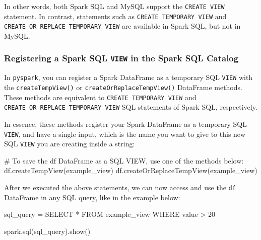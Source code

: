 \documentclass[
  11pt,
  letterpaper,
  DIV=11,
  numbers=noendperiod]{scrreprt}
\newenvironment{Shaded}{\begin{snugshade}}{\end{snugshade}}
\newcommand{\CommentTok}[1]{\textcolor[rgb]{0.37,0.37,0.37}{#1}}
\newcommand{\NormalTok}[1]{\textcolor[rgb]{0.00,0.23,0.31}{#1}}
\newcommand{\OperatorTok}[1]{\textcolor[rgb]{0.37,0.37,0.37}{#1}}
\newcommand{\StringTok}[1]{\textcolor[rgb]{0.13,0.47,0.30}{#1}}
\begin{document}
In other words, both Spark SQL and MySQL support the
\texttt{CREATE\ VIEW} statement. In contrast, statements such as
\texttt{CREATE\ TEMPORARY\ VIEW} and
\texttt{CREATE\ OR\ REPLACE\ TEMPORARY\ VIEW} are available in Spark
SQL, but not in MySQL.

\hypertarget{registering-a-spark-sql-view-in-the-spark-sql-catalog}{%
\subsubsection{\texorpdfstring{Registering a Spark SQL \texttt{VIEW} in
the Spark SQL
Catalog}{Registering a Spark SQL VIEW in the Spark SQL Catalog}}\label{registering-a-spark-sql-view-in-the-spark-sql-catalog}}

In \texttt{pyspark}, you can register a Spark DataFrame as a temporary
SQL \texttt{VIEW} with the \texttt{createTempView()} or
\texttt{createOrReplaceTempView()} DataFrame methods. These methods are
equivalent to \texttt{CREATE\ TEMPORARY\ VIEW} and
\texttt{CREATE\ OR\ REPLACE\ TEMPORARY\ VIEW} SQL statements of Spark
SQL, respectively.

In essence, these methods register your Spark DataFrame as a temporary
SQL \texttt{VIEW}, and have a single input, which is the name you want
to give to this new SQL \texttt{VIEW} you are creating inside a string:

\begin{Shaded}
\begin{Highlighting}[]
\CommentTok{\# To save the \textasciigrave{}df\textasciigrave{} DataFrame as a SQL VIEW, use one of the methods below:}
\NormalTok{df.createTempView(}\StringTok{\textquotesingle{}example\_view\textquotesingle{}}\NormalTok{)}
\NormalTok{df.createOrReplaceTempView(}\StringTok{\textquotesingle{}example\_view\textquotesingle{}}\NormalTok{)}
\end{Highlighting}
\end{Shaded}

After we executed the above statements, we can now access and use the
\texttt{df} DataFrame in any SQL query, like in the example below:

\begin{Shaded}
\begin{Highlighting}[]
\NormalTok{sql\_query }\OperatorTok{=} \StringTok{\textquotesingle{}\textquotesingle{}\textquotesingle{}}
\StringTok{SELECT *}
\StringTok{FROM example\_view}
\StringTok{WHERE value \textgreater{} 20}
\StringTok{\textquotesingle{}\textquotesingle{}\textquotesingle{}}

\NormalTok{spark.sql(sql\_query).show()}
\end{Highlighting}
\end{Shaded}
\end{document}
